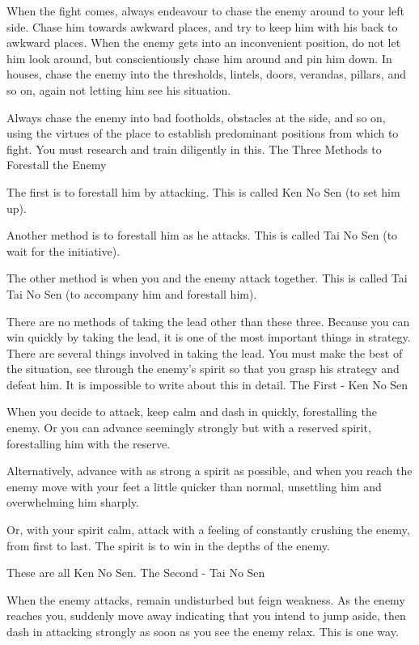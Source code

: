 When the fight comes, always endeavour to chase the enemy around to your left side. Chase him towards awkward places, and try to keep him with his back to awkward places. When the enemy gets into an inconvenient position, do not let him look around, but conscientiously chase him around and pin him down. In houses, chase the enemy into the thresholds, lintels, doors, verandas, pillars, and so on, again not letting him see his situation.

Always chase the enemy into bad footholds, obstacles at the side, and so on, using the virtues of the place to establish predominant positions from which to fight. You must research and train diligently in this.
The Three Methods to Forestall the Enemy

The first is to forestall him by attacking. This is called Ken No Sen (to set him up).

Another method is to forestall him as he attacks. This is called Tai No Sen (to wait for the initiative).

The other method is when you and the enemy attack together. This is called Tai Tai No Sen (to accompany him and forestall him).

There are no methods of taking the lead other than these three. Because you can win quickly by taking the lead, it is one of the most important things in strategy. There are several things involved in taking the lead. You must make the best of the situation, see through the enemy's spirit so that you grasp his strategy and defeat him. It is impossible to write about this in detail.
The First - Ken No Sen

When you decide to attack, keep calm and dash in quickly, forestalling the enemy. Or you can advance seemingly strongly but with a reserved spirit, forestalling him with the reserve.

Alternatively, advance with as strong a spirit as possible, and when you reach the enemy move with your feet a little quicker than normal, unsettling him and overwhelming him sharply.

Or, with your spirit calm, attack with a feeling of constantly crushing the enemy, from first to last. The spirit is to win in the depths of the enemy.

These are all Ken No Sen.
The Second - Tai No Sen

When the enemy attacks, remain undisturbed but feign weakness. As the enemy reaches you, suddenly move away indicating that you intend to jump aside, then dash in attacking strongly as soon as you see the enemy relax. This is one way.

